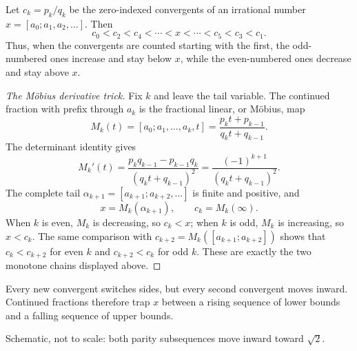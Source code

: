 \begin{theorem}
Let $c_k=p_k/q_k$ be the zero-indexed convergents of an irrational number
$x=[a_0;a_1,a_2,\dots]$. Then
\[
  c_0<c_2<c_4<\cdots<x<\cdots<c_5<c_3<c_1.
\]
Thus, when the convergents are counted starting with the first, the odd-numbered
ones increase and stay below $x$, while the even-numbered ones decrease and
stay above $x$.
\end{theorem}

\begin{proof}[The M\"obius derivative trick]
Fix $k$ and leave the tail variable. The continued fraction with prefix through
$a_k$ is the fractional linear, or M\"obius, map
\[
  M_k(t)=[a_0;a_1,\dots,a_k,t]
  =\frac{p_kt+p_{k-1}}{q_kt+q_{k-1}}.
\]
The determinant identity gives
\[
  M_k'(t)=
  \frac{p_kq_{k-1}-p_{k-1}q_k}{(q_kt+q_{k-1})^2}
  =\frac{(-1)^{k+1}}{(q_kt+q_{k-1})^2}.
\]
The complete tail $\alpha_{k+1}=[a_{k+1};a_{k+2},\dots]$ is finite and positive,
and
\[
  x=M_k(\alpha_{k+1}),\qquad c_k=M_k(\infty).
\]
When $k$ is even, $M_k$ is decreasing, so $c_k<x$; when $k$ is odd,
$M_k$ is increasing, so $x<c_k$. The same comparison with
$c_{k+2}=M_k([a_{k+1};a_{k+2}])$ shows that $c_k<c_{k+2}$ for even $k$ and
$c_{k+2}<c_k$ for odd $k$. These are exactly the two monotone chains displayed
above.
\end{proof}

\begin{bigidea}
Every new convergent switches sides, but every second convergent moves inward.
Continued fractions therefore trap $x$ between a rising sequence of lower
bounds and a falling sequence of upper bounds.
\end{bigidea}

\begin{center}

\small Schematic, not to scale: both parity subsequences move inward toward $\sqrt2$.
\end{center}

